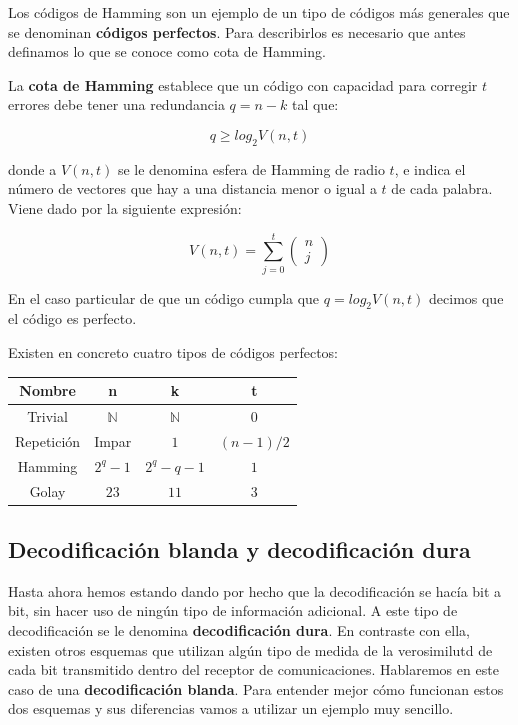 \documentclass[es,apuntes]{uah}
\begin{document}
Los códigos de Hamming son un ejemplo de un tipo de códigos más generales que se denominan {\bf códigos perfectos}. Para describirlos es necesario que antes definamos lo que se conoce como cota de Hamming.

La {\bf cota de Hamming} establece que un código con capacidad para corregir $t$ errores debe tener una redundancia $q=n-k$ tal que:

\begin{displaymath}
	q \geq log_2 V(n,t)
\end{displaymath}

donde a $V(n,t)$ se le denomina esfera de Hamming de radio $t$, e indica el número de vectores que hay a una distancia menor o igual a $t$ de cada palabra. Viene dado por la siguiente expresión:

\begin{displaymath}
	V(n,t) = \sum_{j=0}^t \left ( \begin{array}{c}n \\j \end{array} \right ) 
\end{displaymath}

En el caso particular de que un código cumpla que $q = log_2 V(n,t)$ decimos que el código es perfecto. 

Existen en concreto cuatro tipos de códigos perfectos:

\begin{center}
\begin{tabular}{c|ccc}
	\hline
	Nombre & n & k & t \\
	\hline
	Trivial & $\mathbb{N}$ & $\mathbb{N}$ & $0$  \\
	Repetición & Impar & $1$ & $(n-1)/2$ \\
	Hamming & $2^q-1$ & $2^q-q-1$ & $1$ \\
	Golay & $23$ & $11$ & $3$ \\
	\hline
\end{tabular}
\end{center}

\subsection{Decodificación blanda y decodificación dura}

Hasta ahora hemos estando dando por hecho que la decodificación se hacía bit a bit, sin hacer uso de ningún tipo de información adicional. A este tipo de decodificación se le denomina {\bf decodificación dura}. En contraste con ella, existen otros esquemas que utilizan algún tipo de medida de la verosimilutd de cada bit transmitido dentro del receptor de comunicaciones. Hablaremos en este caso de una {\bf decodificación blanda}. Para entender mejor cómo funcionan estos dos esquemas y sus diferencias vamos a utilizar un ejemplo muy sencillo. 
\end{document}
